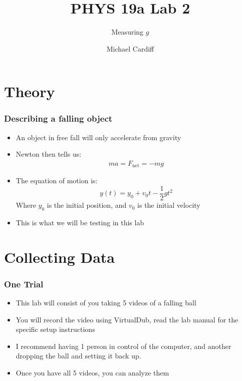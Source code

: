 \documentclass[aspectratio=169]{beamer}
\title{PHYS 19a Lab 2}
\author{Michael Cardiff}
\subtitle{Measuring $g$}
\def\n{5 }
\begin{document}
\begin{frame}
  \titlepage
\end{frame}

\section{Theory}
\begin{frame}
  \frametitle{Describing a falling object}
  \begin{itemize}
  \item An object in free fall will only accelerate from gravity
  \item Newton then tells us:
    \begin{align*}
      ma=F_{\text{net}}=-mg
    \end{align*}
  \item The equation of motion is:
    \begin{equation}
      \label{eq:1}
      \boxed{y(t)=y_0+v_0t-\frac12gt^2}
    \end{equation}
    Where $y_0$ is the initial position, and $v_0$ is the initial velocity
  \item This is what we will be testing in this lab
  \end{itemize}
\end{frame}

\section{Collecting Data}
\begin{frame}
  \frametitle{One Trial}
  \begin{itemize}
  \item This lab will consist of you taking \n videos of a falling ball
  \item You will record the video using VirtualDub, read the lab manual for the specific setup instructions
  \item I recommend having 1 person in control of the computer, and another dropping the ball and setting it back up.
  \item Once you have all \n videos, you can analyze them
  \end{itemize}
\end{frame}
\end{document}
